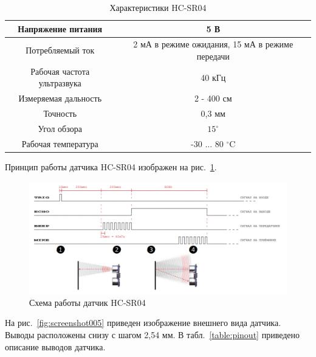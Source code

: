 \documentclass[12pt]{article}
\begin{document}
\begin{table}[H]
	\centering
	\caption{Характеристики HC-SR04}\label{table:techspec}
	\begin{tabular}{c|c}
		\toprule
		Напряжение питания & 5 В \\
		\hline
		Потребляемый ток & 	2 мА в режиме ожидания,
							15 мА в режиме передачи\\
		\hline
		Рабочая частота ультразвука & 40 кГц \\
		\hline
		Измеряемая дальность & 2 - 400 см \\
		\hline
		Точность & 0,3 мм \\
		\hline
		Угол обзора & \(15^{\circ}\)\\
		\hline
		Рабочая температура & -30 ... 80 \(^{\circ}\)C  \\
		\hline
		\bottomrule
	\end{tabular}
\end{table}


Принцип работы датчика HC-SR04 изображен на рис.~\ref{fig:screenshot004}.

\begin{figure}[H]
	\centering
	\includegraphics[width=1.0\linewidth]{images/screenshot004}
	\caption{Схема работы датчик HC-SR04}
	\label{fig:screenshot004}
\end{figure}

На рис.~\ref{fig:screenshot005} приведен изображение внешнего вида датчика. Выводы расположены снизу с шагом 2,54 мм. В табл.~\ref{table:pinout} приведено описание выводов датчика.
\end{document}
